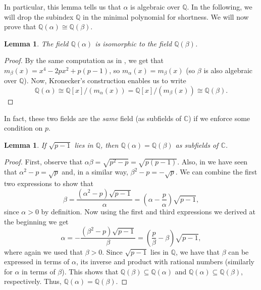 \documentclass[a4paper,11pt]{article}
\theoremstyle{plain}
\newtheorem{lemma}[theorem]{Lemma}
\newcommand{\Q}{\ensuremath{\mathbb{Q}}} %
\newcommand{\C}{\ensuremath{\mathbb{C}}} %
\begin{document}
	In particular, this lemma tells us that $\alpha$ is algebraic over $\Q$. In the following, we will drop the subindex $\Q$ in the minimal polynomial for shortness. We will now prove that $\Q(\alpha)\cong\Q(\beta)$.
	
	\begin{lemma}
		\label{lemma:isomfields}
		The field $\Q(\alpha)$ is isomorphic to the field $\Q(\beta)$.
	\end{lemma}
	\begin{proof}
		By the same computation as in , we get that $m_{\beta}(x)=x^4-2px^2+p(p-1)$, so $m_{\alpha}(x)=m_{\beta}(x)$ (so $\beta$ is also algebraic over $\Q$). Now, Kronecker's construction enables us to write
		\begin{equation*}
			\Q(\alpha)\cong \Q[x]/(m_{\alpha}(x))= \Q[x]/(m_{\beta}(x))\cong\Q(\beta).
		\end{equation*}
	\end{proof}
	
	In fact, these two fields are the \emph{same} field (as subfields of $\C$) if we enforce some condition on $p$.
	
	\begin{lemma}\label{lemma:equalext}
		If $\sqrt{p-1}$ lies in $\Q$, then $\Q(\alpha)=\Q(\beta)$ as subfields of $\C$.
	\end{lemma}
	\begin{proof}
		First, observe that $\alpha\beta=\sqrt{p^2-p}=\sqrt{p(p-1)}$. Also, in  we have seen that $\alpha^2-p=\sqrt{p}$ and, in a similar way, $\beta^2-p=-\sqrt{p}$. We can combine the first two expressions to show that
		\begin{equation}
			\label{eq:beta_ito_alpha}
			\beta=\frac{(\alpha^2-p)\sqrt{p-1}}{\alpha}=\left(\alpha-\frac{p}{\alpha}\right)\sqrt{p-1},
		\end{equation}
		since $\alpha>0$ by definition. Now using the first and third expressions we derived at the beginning we get
		\begin{equation}
			\label{eq:alpha_ito_beta}
			\alpha=-\frac{(\beta^2-p)\sqrt{p-1}}{\beta}=\left(\frac{p}{\beta}-\beta\right)\sqrt{p-1},
		\end{equation}
		where again we used that $\beta>0$. Since $\sqrt{p-1}$ lies in $\Q$, we have that $\beta$ can be expressed in terms of $\alpha$, its inverse and product with rational numbers (similarly for $\alpha$ in terms of $\beta$). This shows that $\Q(\beta)\subseteq\Q(\alpha)$ and $\Q(\alpha)\subseteq\Q(\beta)$, respectively. Thus, $\Q(\alpha)=\Q(\beta)$.
	\end{proof}
	
\end{document}
